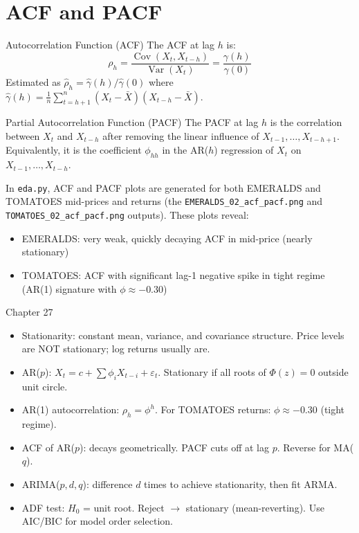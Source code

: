 \documentclass[12pt,a4paper,openany]{report}
\theoremstyle{definition}
\newcommand{\Var}{\operatorname{Var}}
\newcommand{\Cov}{\operatorname{Cov}}
\begin{document}
\section{ACF and PACF}

\begin{definitionbox}{Autocorrelation Function (ACF)}
The ACF at lag $h$ is:
\[
  \rho_h = \frac{\Cov(X_t, X_{t-h})}{\Var(X_t)} = \frac{\gamma(h)}{\gamma(0)}
\]
Estimated as $\hat{\rho}_h = \hat{\gamma}(h)/\hat{\gamma}(0)$ where $\hat{\gamma}(h) = \frac{1}{n}\sum_{t=h+1}^n(X_t - \bar{X})(X_{t-h} - \bar{X})$.
\end{definitionbox}

\begin{definitionbox}{Partial Autocorrelation Function (PACF)}
The PACF at lag $h$ is the correlation between $X_t$ and $X_{t-h}$ after removing the linear influence of $X_{t-1}, \ldots, X_{t-h+1}$. Equivalently, it is the coefficient $\phi_{hh}$ in the AR($h$) regression of $X_t$ on $X_{t-1}, \ldots, X_{t-h}$.
\end{definitionbox}

In \texttt{eda.py}, ACF and PACF plots are generated for both EMERALDS and TOMATOES mid-prices and returns (the \texttt{EMERALDS\_02\_acf\_pacf.png} and \texttt{TOMATOES\_02\_acf\_pacf.png} outputs). These plots reveal:
\begin{itemize}
  \item EMERALDS: very weak, quickly decaying ACF in mid-price (nearly stationary)
  \item TOMATOES: ACF with significant lag-1 negative spike in tight regime (AR(1) signature with $\phi \approx -0.30$)
\end{itemize}

\begin{takeawaybox}{Chapter 27}
\begin{itemize}
  \item Stationarity: constant mean, variance, and covariance structure. Price levels are NOT stationary; log returns usually are.
  \item AR($p$): $X_t = c + \sum\phi_i X_{t-i} + \varepsilon_t$. Stationary if all roots of $\Phi(z)=0$ outside unit circle.
  \item AR(1) autocorrelation: $\rho_h = \phi^h$. For TOMATOES returns: $\phi \approx -0.30$ (tight regime).
  \item ACF of AR($p$): decays geometrically. PACF cuts off at lag $p$. Reverse for MA($q$).
  \item ARIMA($p,d,q$): difference $d$ times to achieve stationarity, then fit ARMA.
  \item ADF test: $H_0$ = unit root. Reject $\to$ stationary (mean-reverting). Use AIC/BIC for model order selection.
\end{itemize}
\end{takeawaybox}
\end{document}
